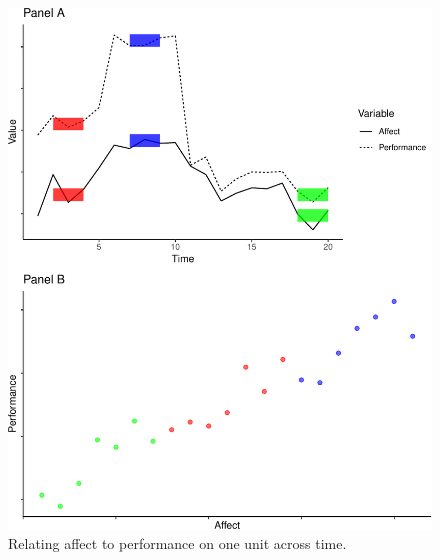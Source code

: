 \documentclass[english,,man]{apa6}
\theoremstyle{definition}
\theoremstyle{definition}
\theoremstyle{definition}
\theoremstyle{remark}
\begin{document}
\begin{figure}
\centering
\includegraphics{figures/unnamed-chunk-17-1.pdf}
\caption{\label{fig:unnamed-chunk-17}Relating affect to performance on one
unit across time.\label{relation_ts}}
\end{figure}
\end{document}
